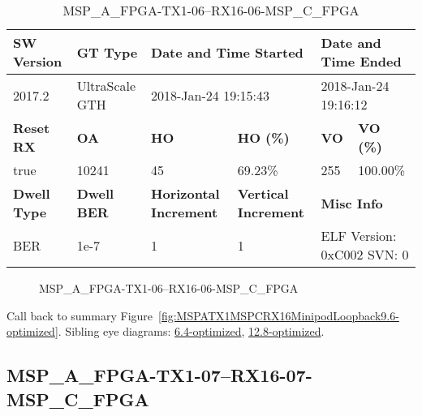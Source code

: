 \begin{table}[h]
\centering
\caption{MSP\_A\_FPGA-TX1-06--RX16-06-MSP\_C\_FPGA}
\label{tab:MSPAFPGATX106RX1606MSPCFPGA9.6-optimized}
\begin{tabular}{@{}|l|l|l|l|l|l|@{}}
\toprule
\textbf{SW Version}                & \textbf{GT Type}   & \multicolumn{2}{l|}{\textbf{Date and Time Started}}            & \multicolumn{2}{l|}{\textbf{Date and Time Ended}}        \\ \midrule
2017.2                       & UltraScale GTH          & \multicolumn{2}{l|}{2018-Jan-24 19:15:43}                   & \multicolumn{2}{l|}{2018-Jan-24 19:16:12}               \\ \midrule
\textbf{Reset RX}                  & \textbf{OA} & \textbf{HO}   & \textbf{HO (\%)} & \textbf{VO} & \textbf{VO (\%)} \\ \midrule
true & 10241        & 45          & 69.23\%        & 255        & 100.00\%       \\ \midrule
\textbf{Dwell Type}                & \textbf{Dwell BER} & \textbf{Horizontal Increment} & \textbf{Vertical Increment}    & \multicolumn{2}{l|}{\textbf{Misc Info}}                  \\ \midrule
BER                            & 1e-7        & 1        & 1           & \multicolumn{2}{l|}{ELF Version: 0xC002 SVN: 0}                         \\ \bottomrule
\end{tabular}
\end{table}

\begin{figure}[h]
\caption{MSP\_A\_FPGA-TX1-06--RX16-06-MSP\_C\_FPGA} \label{fig:MSPAFPGATX106RX1606MSPCFPGA9.6-optimized}
\end{figure}

Call back to summary Figure~\ref{fig:MSPATX1MSPCRX16MinipodLoopback9.6-optimized}.
Sibling eye diagrams: \hyperref[sec:MSPAFPGATX106RX1606MSPCFPGA6.4-optimized]{6.4-optimized}, \hyperref[sec:MSPAFPGATX106RX1606MSPCFPGA12.8-optimized]{12.8-optimized}.

\clearpage
\newpage


\subsection{MSP\_A\_FPGA-TX1-07--RX16-07-MSP\_C\_FPGA}\label{sec:MSPAFPGATX107RX1607MSPCFPGA9.6-optimized}

